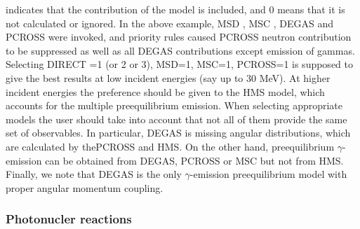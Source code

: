  indicates that the contribution of the model is included, and 0
means that it is not calculated or ignored. In the above example, MSD%
, MSC%
, DEGAS%
 and PCROSS%
 were invoked, and priority rules caused PCROSS neutron
contribution to be suppressed as well as all DEGAS contributions except
emission of gammas. Selecting DIRECT =1 (or 2 or 3), MSD=1, MSC=1, PCROSS=1
is supposed to give the best results at low incident energies (say up to 30
MeV). At higher incident energies the preference should be given to the HMS%
 model, which accounts for the multiple preequilibrium emission.
When selecting appropriate models the user should take into account that not
all of them provide the same set of observables. In particular, DEGAS%
 is missing angular distributions, which are calculated by
thePCROSS and HMS. On the other hand, preequilibrium $\gamma$-emission can
be obtained from DEGAS, PCROSS or MSC but not from HMS. Finally, we note
that DEGAS is the only $\gamma$-emission preequilibrium model with proper
angular momentum coupling.

\subsubsection{\label{sec:photonuclear} Photonucler reactions}

